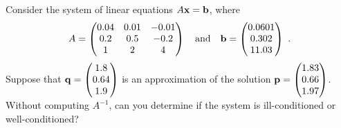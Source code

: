 \begin{question}
Consider the system of linear equations $A\mathbf{x} = \mathbf{b}$, where
\[
A = \begin{pmatrix}
0.04 & 0.01 & -0.01 \\
0.2 & 0.5 & -0.2 \\
1 & 2 & 4
\end{pmatrix}
\quad \text{and} \quad
\VEC{b} = \begin{pmatrix} 0.0601 \\ 0.302 \\ 11.03 \end{pmatrix} \ .
\]
Suppose that
$\displaystyle
\mathbf{q} = \begin{pmatrix} 1.8 \\ 0.64 \\ 1.9 \end{pmatrix}$
is an approximation of the solution
$\displaystyle
\mathbf{p} = \begin{pmatrix} 1.83 \\ 0.66 \\ 1.97 \end{pmatrix}$.
Without computing $A^{-1}$, can you determine if the system is
ill-conditioned or well-conditioned?
\label{solvCQ7}
\end{question}

